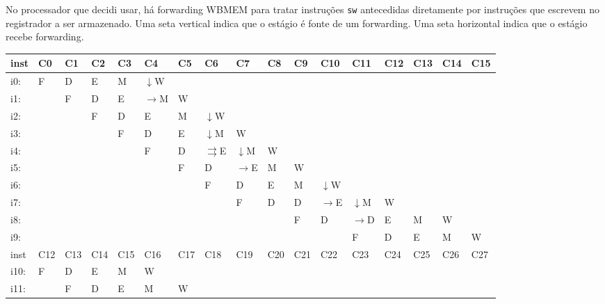 \documentclass{article}
\begin{document}
\begin{enumerate}
No processador que decidi usar, há forwarding WB\textrightarrow MEM para tratar instruções \verb|sw| antecedidas diretamente por instruções que escrevem no registrador a ser armazenado. Uma seta vertical indica que o estágio é fonte de um forwarding. Uma seta horizontal indica que o estágio recebe forwarding.
\begin{table}[H]
\begin{tabular}{|l|l|l|l|l|l|l|l|l|l|l|l|l|l|l|l|l|}
\hline
inst & C0  & C1  & C2  & C3  & C4  & C5  & C6  & C7  & C8  & C9  & C10 & C11 & C12 & C13 & C14 & C15 \\ \hline
i0:  &  F  &  D  &  E  &  M  &$\downarrow$W  &     &     &     &     &     &     &     &     &     &     &     \\ \hline
i1:  &     &  F  &  D  &  E  &$\rightarrow$M  &  W  &     &     &     &     &     &     &     &     &     &     \\ \hline
i2:  &     &     &  F  &  D  &  E  &  M  &$\downarrow$W  &     &     &     &     &     &     &     &     &     \\ \hline
i3:  &     &     &     &  F  &  D  &  E  &$\downarrow$M  &  W  &     &     &     &     &     &     &     &     \\ \hline
i4:  &     &     &     &     &  F  &  D  &$\rightrightarrows$E  &$\downarrow$M  &  W  &     &     &     &     &     &     &     \\ \hline
i5:  &     &     &     &     &     &  F  &  D  &$\rightarrow$E  &  M  &  W  &     &     &     &     &     &     \\ \hline
i6:  &     &     &     &     &     &     &  F  &  D  &  E  &  M  &$\downarrow$W  &     &     &     &     &     \\ \hline
i7:  &     &     &     &     &     &     &     &  F  &  D  &  D  &$\rightarrow$E  &$\downarrow$M  &  W  &     &     &     \\ \hline
i8:  &     &     &     &     &     &     &     &     &     &  F  &  D  &$\rightarrow$D  &  E  &  M  &  W  &     \\ \hline
i9:  &     &     &     &     &     &     &     &     &     &     &     &  F  &  D  &  E  &  M  &  W  \\ \hline
inst & C12 & C13 & C14 & C15 & C16 & C17 & C18 & C19 & C20 & C21 & C22 & C23 & C24 & C25 & C26 & C27 \\ \hline
i10: &  F  &  D  &  E  &  M  &  W  &     &     &     &     &     &     &     &     &     &     &     \\ \hline
i11: &     &  F  &  D  &  E  &  M  &  W  &     &     &     &     &     &     &     &     &     &     \\ \hline

\end{tabular}
\end{table}
\end{enumerate}
\end{document}
